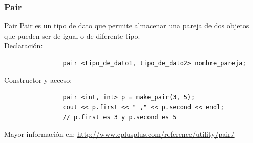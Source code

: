 \documentclass{beamer}
\begin{document}
	
	\begin{frame}[fragile]
		\frametitle{Pair}
		\begin{block}{Pair}
			Pair es un tipo de dato que permite almacenar una pareja de dos objetos que pueden ser de igual o de diferente tipo.\\
			Declaración:
			\begin{verbatim}
				pair <tipo_de_dato1, tipo_de_dato2> nombre_pareja;
			\end{verbatim}
			Constructor y acceso:
			\begin{verbatim}
				pair <int, int> p = make_pair(3, 5);
				cout << p.first << " ," << p.second << endl;
				// p.first es 3 y p.second es 5
			\end{verbatim}
		\end{block}
		Mayor información en: \url{http://www.cplusplus.com/reference/utility/pair/}
	\end{frame}
	
\end{document}
